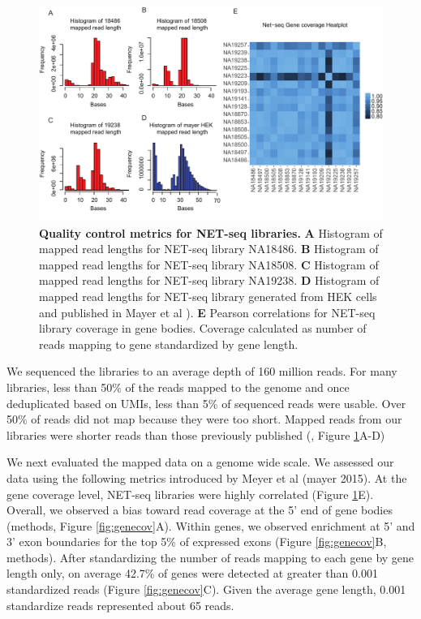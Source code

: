 \begin{figure}
\centering \includegraphics[trim=0 .3in 0
  0,clip,width=5in]{img/ch04/Figure2.pdf}
\caption[Quality control metrics for NET-seq libraries.]{\textbf{Quality control metrics for NET-seq libraries.} {\bf A} Histogram of mapped read lengths for NET-seq library NA18486. {\bf B} Histogram of mapped read lengths for NET-seq library NA18508. {\bf C} Histogram of mapped read lengths for NET-seq library NA19238. {\bf D} Histogram of mapped read lengths for NET-seq library generated from HEK cells and published in Mayer et al \citep{mayer_native_2015}). {\bf E} Pearson correlations for NET-seq library coverage in gene bodies. Coverage calculated as number of reads mapping to gene standardized by gene length.}
\label{fig:qualCont}
\end{figure}

We sequenced the libraries to an average depth of 160 million reads. For many libraries, less than 50\% of the reads mapped to the genome and once deduplicated based on UMIs, less than 5\% of sequenced reads were usable. Over 50\% of reads did not map because they were too short. Mapped reads from our libraries were shorter reads than those previously published (\citep{mayer_native_2015}, Figure \ref{fig:qualCont}A-D)


We next evaluated the mapped data on a genome wide scale. We assessed our data using the following metrics introduced by Meyer et al (mayer 2015). At the gene coverage level, NET-seq libraries were highly correlated (Figure \ref{fig:qualCont}E). Overall, we observed a bias toward read coverage at the 5' end of gene bodies (methods, Figure \ref{fig:genecov}A).  Within genes, we observed enrichment at 5' and 3' exon boundaries for the top 5\% of expressed exons (Figure \ref{fig:genecov}B, methods). After standardizing the number of reads mapping to each gene by gene length only, on average 42.7\% of genes were detected at greater than 0.001 standardized reads (Figure \ref{fig:genecov}C). Given the average gene length, 0.001 standardize reads represented about 65 reads. 


